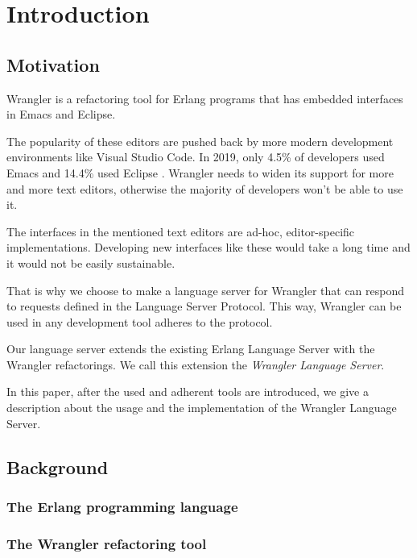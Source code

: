 \chapter{Introduction}
\label{ch:intro}


\section{Motivation}


Wrangler is a refactoring tool for Erlang programs that has embedded interfaces in Emacs and Eclipse.

The popularity of these editors are pushed back by more modern development environments like Visual Studio Code. In 2019, only 4.5\% of developers used Emacs and 14.4\% used Eclipse \cite{DevSurvey}. Wrangler needs to widen its support for more and more text editors, otherwise the majority of developers won’t be able to use it.

The interfaces in the mentioned text editors are ad-hoc, editor-specific implementations. 
Developing new interfaces like these would take a long time and it would not be easily sustainable. 

That is why we choose to make a language server for Wrangler that can respond to requests defined in the Language Server Protocol. This way, Wrangler can be used in any development tool adheres to the protocol.

Our language server extends the existing Erlang Language Server with the Wrangler refactorings. We call this extension the \emph{Wrangler Language Server}.

In this paper, after the used and adherent tools are introduced, we give a description about the usage and the implementation of the Wrangler Language Server.

\section{Background}

\subsection{The Erlang programming language}


\subsection{The Wrangler refactoring tool}

